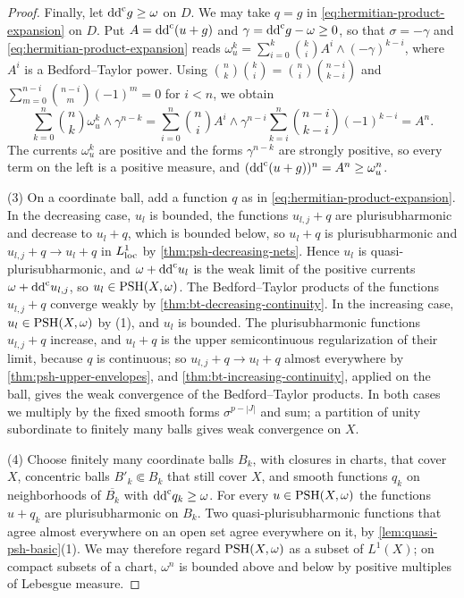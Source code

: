 \begin{proof}
Finally, let $\mathrm{dd}^{\mathrm{c}} g\geq\omega$ on $D$. We may take $q=g$ in \eqref{eq:hermitian-product-expansion} on $D$. Put $A=\mathrm{dd}^{\mathrm{c}}(u+g)$ and $\gamma=\mathrm{dd}^{\mathrm{c}} g-\omega\geq0$, so that $\sigma=-\gamma$ and \eqref{eq:hermitian-product-expansion} reads $\omega_u^k=\sum_{i=0}^k\binom ki A^i\wedge(-\gamma)^{k-i}$, where $A^i$ is a Bedford--Taylor power. Using $\binom nk\binom ki=\binom ni\binom{n-i}{k-i}$ and $\sum_{m=0}^{n-i}\binom{n-i}m(-1)^m=0$ for $i<n$, we obtain
\[
 \sum_{k=0}^n\binom nk\omega_u^k\wedge\gamma^{n-k}
 =\sum_{i=0}^n\binom niA^i\wedge\gamma^{n-i}\sum_{k=i}^n\binom{n-i}{k-i}(-1)^{k-i}
 =A^n.
\]
The currents $\omega_u^k$ are positive and the forms $\gamma^{n-k}$ are strongly positive, so every term on the left is a positive measure, and $(\mathrm{dd}^{\mathrm{c}}(u+g))^n=A^n\geq\omega_u^n$.

(3) On a coordinate ball, add a function $q$ as in \eqref{eq:hermitian-product-expansion}. In the decreasing case, $u_l$ is bounded, the functions $u_{l,j}+q$ are plurisubharmonic and decrease to $u_l+q$, which is bounded below, so $u_l+q$ is plurisubharmonic and $u_{l,j}+q\to u_l+q$ in $L^1_{\mathrm{loc}}$ by \cref{thm:psh-decreasing-nets}. Hence $u_l$ is quasi-plurisubharmonic, and $\omega+\mathrm{dd}^{\mathrm{c}} u_l$ is the weak limit of the positive currents $\omega+\mathrm{dd}^{\mathrm{c}} u_{l,j}$, so $u_l\in\mathrm{PSH}(X,\omega)$. The Bedford--Taylor products of the functions $u_{l,j}+q$ converge weakly by \cref{thm:bt-decreasing-continuity}. In the increasing case, $u_l\in\mathrm{PSH}(X,\omega)$ by (1), and $u_l$ is bounded. The plurisubharmonic functions $u_{l,j}+q$ increase, and $u_l+q$ is the upper semicontinuous regularization of their limit, because $q$ is continuous; so $u_{l,j}+q\to u_l+q$ almost everywhere by \cref{thm:psh-upper-envelopes}, and \cref{thm:bt-increasing-continuity}, applied on the ball, gives the weak convergence of the Bedford--Taylor products. In both cases we multiply by the fixed smooth forms $\sigma^{p-|J|}$ and sum; a partition of unity subordinate to finitely many balls gives weak convergence on $X$.

(4) Choose finitely many coordinate balls $B_k$, with closures in charts, that cover $X$, concentric balls $B'_k\Subset B_k$ that still cover $X$, and smooth functions $q_k$ on neighborhoods of $\overline{B_k}$ with $\mathrm{dd}^{\mathrm{c}} q_k\geq\omega$. For every $u\in\mathrm{PSH}(X,\omega)$ the functions $u+q_k$ are plurisubharmonic on $B_k$. Two quasi-plurisubharmonic functions that agree almost everywhere on an open set agree everywhere on it, by \cref{lem:quasi-psh-basic}(1). We may therefore regard $\mathrm{PSH}(X,\omega)$ as a subset of $L^1(X)$; on compact subsets of a chart, $\omega^n$ is bounded above and below by positive multiples of Lebesgue measure.


\end{proof}
